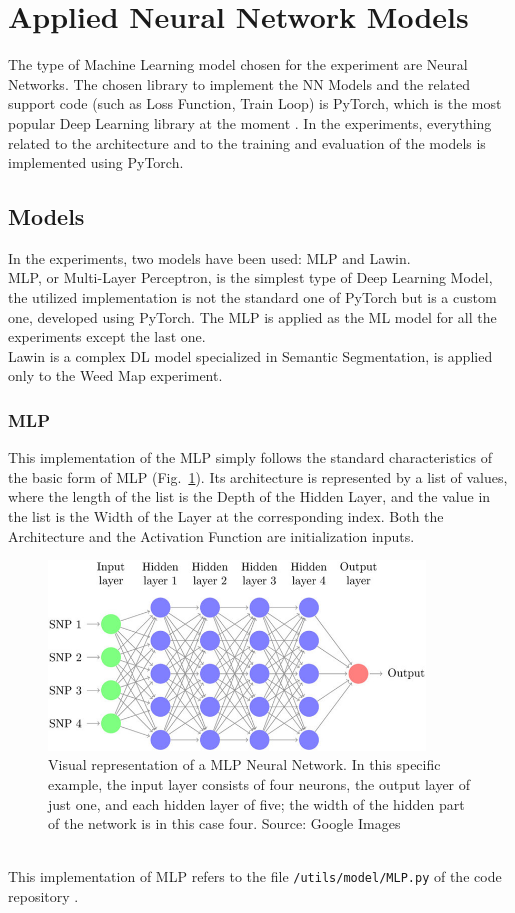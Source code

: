 \section{Applied Neural Network Models}

The type of Machine Learning model chosen for the experiment are Neural Networks.
The chosen library to implement the NN Models and the related support code (such as Loss Function, Train Loop) is PyTorch, which is the most popular Deep Learning library at the moment \cite{PyTorch}.
In the experiments, everything related to the architecture and to the training and evaluation of the models is implemented using PyTorch.

\subsection{Models}

In the experiments, two models have been used: MLP and Lawin.
\\[0.3cm]MLP, or Multi-Layer Perceptron, is the simplest type of Deep Learning Model, the utilized implementation is not the standard one of PyTorch but is a custom one, developed using PyTorch. The MLP is applied as the ML model for all the experiments except the last one.
\\[0.3cm]Lawin is a complex DL model specialized in Semantic Segmentation, is applied only to the Weed Map experiment.

\subsubsection{MLP}

This implementation of the MLP simply follows the standard characteristics of the basic form of MLP (Fig.~\ref{fig:figure-3.4.1}).
Its architecture is represented by a list of values, where the length of the list is the Depth of the Hidden Layer, and the value in the list is the Width of the Layer at the corresponding index.
Both the Architecture and the Activation Function are initialization inputs.
\begin{figure}[t]
	\centering
	\includegraphics[width=10cm]{figures/figure-3.4.1.png}
	\caption[Visual Example Representation of MLP]{Visual representation of a MLP Neural Network. In this specific example, the input layer consists of four neurons, the output layer of just one, and each hidden layer of five; the width of the hidden part of the network is in this case four. Source: Google Images}
	\label{fig:figure-3.4.1}
\end{figure}
\\[0.3cm]This implementation of MLP refers to the file \texttt{/utils/model/MLP.py} of the code repository \cite{Repository-THESIS}.


